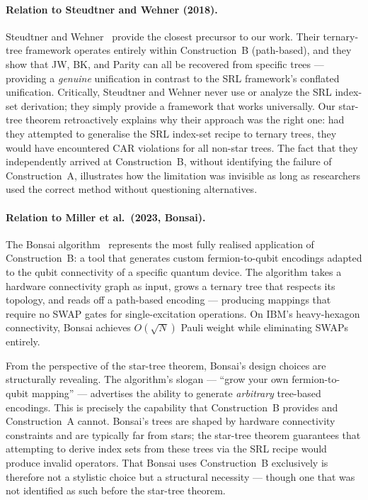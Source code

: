 \paragraph{Relation to Steudtner and Wehner (2018).}
Steudtner and Wehner~\cite{steudtner2018} provide the closest
precursor to our work.  Their ternary-tree framework operates
entirely within Construction~B (path-based), and they show that
JW, BK, and Parity can all be recovered from specific trees ---
providing a \emph{genuine} unification in contrast to the SRL
framework's conflated unification.  Critically, Steudtner and Wehner
never use or analyze the SRL index-set derivation; they simply
provide a framework that works universally.  Our star-tree theorem
retroactively explains why their approach was the right one: had they
attempted to generalise the SRL index-set recipe to ternary trees,
they would have encountered CAR violations for all non-star trees.
The fact that they independently arrived at Construction~B, without
identifying the failure of Construction~A, illustrates how the
limitation was invisible as long as researchers used the correct
method without questioning alternatives.

\paragraph{Relation to Miller et al.\ (2023, Bonsai).}
The Bonsai algorithm~\cite{miller2023bonsai} represents the most
fully realised application of Construction~B: a tool that generates
custom fermion-to-qubit encodings adapted to the qubit connectivity
of a specific quantum device.  The algorithm takes a hardware
connectivity graph as input, grows a ternary tree that respects its
topology, and reads off a path-based encoding --- producing mappings
that require no SWAP gates for single-excitation operations.
On IBM's heavy-hexagon connectivity, Bonsai achieves $O(\sqrt{N})$
Pauli weight while eliminating SWAPs entirely.

From the perspective of the star-tree theorem, Bonsai's design
choices are structurally revealing.  The algorithm's slogan ---
``grow your own fermion-to-qubit mapping'' --- advertises the ability
to generate \emph{arbitrary} tree-based encodings.  This is precisely
the capability that Construction~B provides and Construction~A cannot.
Bonsai's trees are shaped by hardware connectivity constraints and are
typically far from stars; the star-tree theorem guarantees that
attempting to derive index sets from these trees via the SRL recipe
would produce invalid operators.  That Bonsai uses Construction~B
exclusively is therefore not a stylistic choice but a structural
necessity --- though one that was not identified as such before the
star-tree theorem.


